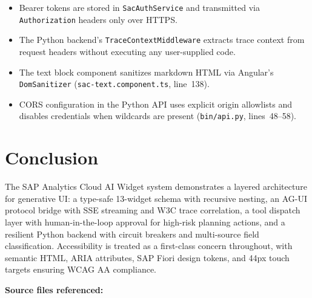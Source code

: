 \documentclass[11pt]{article}
\begin{document}
\begin{itemize}
  \item Bearer tokens are stored in \texttt{SacAuthService} and transmitted
    via \texttt{Authorization} headers only over HTTPS.
  \item The Python backend's \texttt{TraceContextMiddleware} extracts trace
    context from request headers without executing any user-supplied code.
  \item The text block component sanitizes markdown HTML via Angular's
    \texttt{DomSanitizer} (\texttt{sac-text.component.ts}, line~138).
  \item CORS configuration in the Python API uses explicit origin allowlists
    and disables credentials when wildcards are present
    (\texttt{bin/api.py}, lines~48--58).
\end{itemize}

\section{Conclusion}

The SAP Analytics Cloud AI Widget system demonstrates a layered architecture
for generative UI: a type-safe 13-widget schema with recursive nesting, an
AG-UI protocol bridge with SSE streaming and W3C trace correlation, a tool
dispatch layer with human-in-the-loop approval for high-risk planning actions,
and a resilient Python backend with circuit breakers and multi-source field
classification. Accessibility is treated as a first-class concern throughout,
with semantic HTML, ARIA attributes, SAP Fiori design tokens, and 44px touch
targets ensuring WCAG AA compliance.

\vspace{1em}
\noindent\textbf{Source files referenced:}
\end{document}
